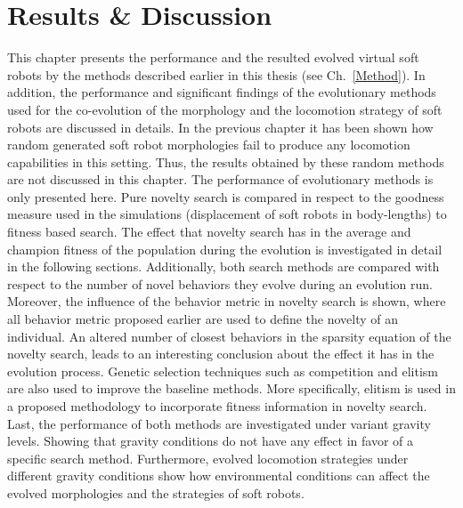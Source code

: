 
\chapter{Results \& Discussion} %

\label{Results} %


This chapter presents the performance and the resulted evolved virtual soft robots by the methods described earlier in this thesis (see Ch.~\ref{Method}). In addition, the performance and significant findings of the evolutionary methods used for the co-evolution of the morphology and the locomotion strategy of soft robots are discussed in details. In the previous chapter it has been shown how random generated soft robot morphologies fail to produce any locomotion capabilities in this setting. Thus, the results obtained by these random methods are not discussed in this chapter. The performance of evolutionary methods is only presented here. Pure novelty search is compared in respect to the goodness measure used in the simulations (displacement of soft robots in body-lengths) to fitness based search. The effect that novelty search has in the average and champion fitness of the population during the evolution is investigated in detail in the following sections. Additionally, both search methods are compared with respect to the number of novel behaviors they evolve during an evolution run. Moreover, the influence of the behavior metric in novelty search is shown, where all behavior metric proposed earlier are used to define the novelty of an individual. An altered number of closest behaviors in the sparsity equation of the novelty search, leads to an interesting conclusion about the effect it has in the evolution process. Genetic selection techniques such as competition and elitism are also used to improve the baseline methods. More specifically, elitism is used in a proposed methodology to incorporate fitness information in novelty search. Last, the performance of both methods are investigated under variant gravity levels. Showing that gravity conditions do not have any effect in favor of a specific search method. Furthermore, evolved locomotion strategies under different gravity conditions show how environmental conditions can affect the evolved morphologies and the strategies of soft robots.

